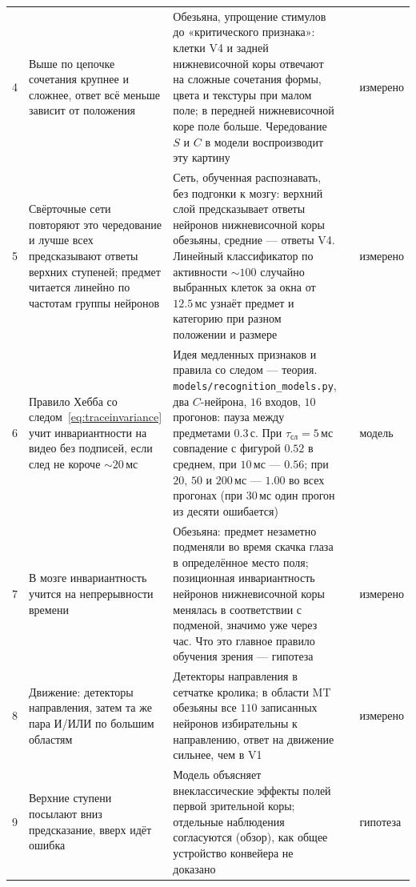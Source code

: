 {\begin{longtable}{>{\raggedright}p{0.5cm}>{\raggedright}p{4.0cm}>{\raggedright}p{5.6cm}>{\raggedright}p{2.3cm}>{\raggedright\arraybackslash}p{1.7cm}}
4 & Выше по цепочке сочетания крупнее и сложнее, ответ всё меньше зависит от положения & Обезьяна, упрощение стимулов до «критического признака»: клетки V4 и задней нижневисочной коры отвечают на сложные сочетания формы, цвета и текстуры при малом поле; в передней нижневисочной коре поле больше. Чередование $S$ и $C$ в модели воспроизводит эту картину & \cite{KobatakeTanaka1994,Riesenhuber1999} & измерено \\
5 & Свёрточные сети повторяют это чередование и лучше всех предсказывают ответы верхних ступеней; предмет читается линейно по частотам группы нейронов & Сеть, обученная распознавать, без подгонки к мозгу: верхний слой предсказывает ответы нейронов нижневисочной коры обезьяны, средние --- ответы V4. Линейный классификатор по активности $\sim100$ случайно выбранных клеток за окна от $12.5$\,мс узнаёт предмет и категорию при разном положении и размере & \cite{Fukushima1980,Yamins2014,Hung2005} & измерено \\
6 & Правило Хебба со следом~\eqref{eq:traceinvariance} учит инвариантности на видео без подписей, если след не короче $\sim20$\,мс & Идея медленных признаков и правила со следом --- теория. \texttt{models/\allowbreak recognition\_models.py}, два $C$-нейрона, $16$ входов, $10$ прогонов: пауза между предметами $0.3$\,с. При $\tau_{\text{сл}}=5$\,мс совпадение с фигурой $0.52$ в среднем, при $10$\,мс --- $0.56$; при $20$, $50$ и $200$\,мс --- $1.00$ во всех прогонах (при $30$\,мс один прогон из десяти ошибается) & \cite{Foldiak1991,WiskottSejnowski2002} & модель \\
7 & В мозге инвариантность учится на непрерывности времени & Обезьяна: предмет незаметно подменяли во время скачка глаза в определённое место поля; позиционная инвариантность нейронов нижневисочной коры менялась в соответствии с подменой, значимо уже через час. Что это главное правило обучения зрения --- гипотеза & \cite{LiDiCarlo2008} & измерено \\
8 & Движение: детекторы направления, затем та же пара И/ИЛИ по большим областям & Детекторы направления в сетчатке кролика; в области MT обезьяны все $110$ записанных нейронов избирательны к направлению, ответ на движение сильнее, чем в V1 & \cite{Barlow1965,Albright1984} & измерено \\
9 & Верхние ступени посылают вниз предсказание, вверх идёт ошибка & Модель объясняет внеклассические эффекты полей первой зрительной коры; отдельные наблюдения согласуются (обзор), как общее устройство конвейера не доказано & \cite{RaoBallard1999,Keller2018} & гипотеза \\

\end{longtable}}
